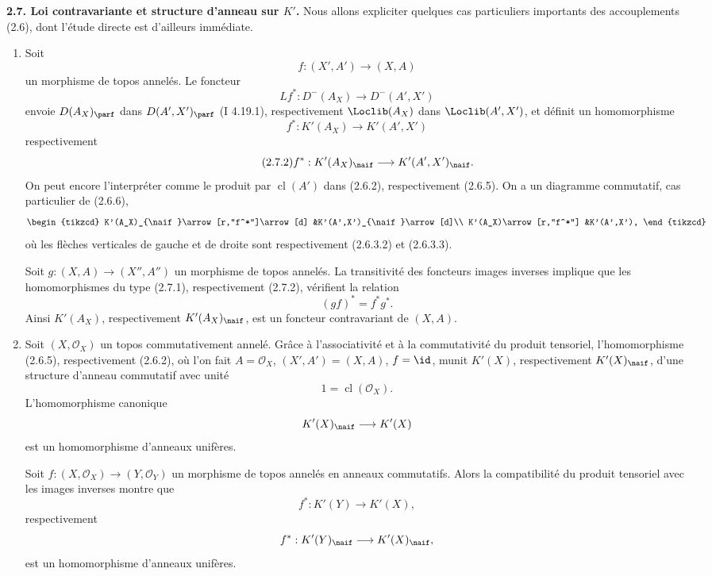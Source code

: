 \documentclass[11pt]{article}
\newcommand{\cl}{\operatorname{cl}}
\begin{document}
\textbf{2.7. Loi contravariante et structure d'anneau sur \(K'\).} Nous allons expliciter quelques cas particuliers importants des accouplements (2.6), dont l'étude directe est d'ailleurs immédiate.
\begin{enumerate}[label=\alph*)]
\item Soit
\[
 f:(X',A')\longrightarrow (X,A)
\]
un morphisme de topos annelés. Le foncteur
\[
 Lf^*:D^-(A_X)\longrightarrow D^-(A',X')
\]
envoie \(D(A_X)_{\parf}\) dans \(D(A',X')_{\parf}\) (I 4.19.1), respectivement \(\Loclib(A_X)\) dans \(\Loclib(A',X')\), et définit un homomorphisme
\begin{equation}\tag{2.7.1}
 f^*:K'(A_X)\longrightarrow K'(A',X')
\end{equation}
respectivement
\begin{equation}\tag{2.7.2}
 f^*:K'(A_X)_{\naif}\longrightarrow K'(A',X')_{\naif}.
\end{equation}
On peut encore l'interpréter comme le produit par \(\cl(A')\) dans (2.6.2), respectivement (2.6.5). On a un diagramme commutatif, cas particulier de (2.6.6),
\[
\begin{tikzcd}
K'(A_X)_{\naif}\arrow[r,"f^*"]\arrow[d]
&K'(A',X')_{\naif}\arrow[d]\\
K'(A_X)\arrow[r,"f^*"]
&K'(A',X'),
\end{tikzcd}
\]
où les flèches verticales de gauche et de droite sont respectivement (2.6.3.2) et (2.6.3.3).

Soit \(g:(X,A)\to(X'',A'')\) un morphisme de topos annelés. La transitivité des foncteurs images inverses implique que les homomorphismes du type (2.7.1), respectivement (2.7.2), vérifient la relation
\begin{equation}\tag{2.7.3}
 (gf)^*=f^*g^*.
\end{equation}
Ainsi \(K'(A_X)\), respectivement \(K'(A_X)_{\naif}\), est un foncteur contravariant de \((X,A)\).

\item Soit \((X,\mathcal O_X)\) un topos commutativement annelé. Grâce à l'associativité et à la commutativité du produit tensoriel, l'homomorphisme (2.6.5), respectivement (2.6.2), où l'on fait \(A=\mathcal O_X\), \((X',A')=(X,A)\), \(f=\id\), munit \(K'(X)\), respectivement \(K'(X)_{\naif}\), d'une structure d'anneau commutatif avec unité
\[
 1=\cl(\mathcal O_X).
\]
L'homomorphisme canonique
\[
 K'(X)_{\naif}\longrightarrow K'(X)
\]
est un homomorphisme d'anneaux unifères.

Soit \(f:(X,\mathcal O_X)\to(Y,\mathcal O_Y)\) un morphisme de topos annelés en anneaux commutatifs. Alors la compatibilité du produit tensoriel avec les images inverses montre que
\[
 f^*:K'(Y)\longrightarrow K'(X),
\]
respectivement
\[
 f^*:K'(Y)_{\naif}\longrightarrow K'(X)_{\naif},
\]
est un homomorphisme d'anneaux unifères.
\end{enumerate}
\end{document}
